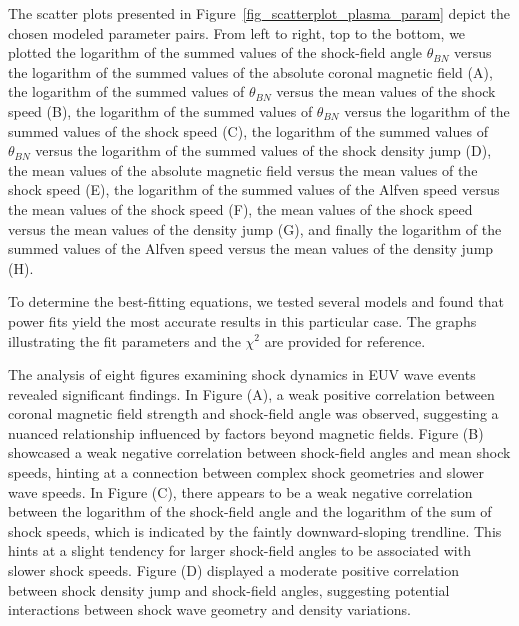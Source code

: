 The scatter plots presented in Figure~\ref{fig_scatterplot_plasma_param} depict the chosen modeled parameter pairs. From left to right, top to the bottom, we plotted the logarithm of the summed values of the shock-field angle $\theta_{BN}$ versus the logarithm of the summed values of the absolute coronal magnetic field (A), the logarithm of the summed values of $\theta_{BN}$ versus the mean values of the shock speed (B), the logarithm of the summed values of $\theta_{BN}$ versus the logarithm of the summed values of the shock speed (C), the logarithm of the summed values of $\theta_{BN}$ versus the logarithm of the summed values of the shock density jump (D), the mean values of the absolute magnetic field versus the mean values of the shock speed (E), the logarithm of the summed values of the Alfven speed versus the mean values of the shock speed (F), the mean values of the shock speed versus the mean values of the density jump (G), and finally the logarithm of the summed values of the Alfven speed versus the mean values of the density jump (H).

To determine the best-fitting equations, we tested several models and found that power fits yield the most accurate results in this particular case. The graphs illustrating the fit parameters and the $\chi^2$ are provided for reference.


The analysis of eight figures examining shock dynamics in EUV wave events revealed significant findings. In Figure (A), a weak positive correlation between coronal magnetic field strength and shock-field angle was observed, suggesting a nuanced relationship influenced by factors beyond magnetic fields. Figure (B) showcased a weak negative correlation between shock-field angles and mean shock speeds, hinting at a connection between complex shock geometries and slower wave speeds. In Figure (C), there appears to be a weak negative correlation between the logarithm of the shock-field angle and the logarithm of the sum of shock speeds, which is indicated by the faintly downward-sloping trendline. This hints at a slight tendency for larger shock-field angles to be associated with slower shock speeds. Figure (D) displayed a moderate positive correlation between shock density jump and shock-field angles, suggesting potential interactions between shock wave geometry and density variations.

